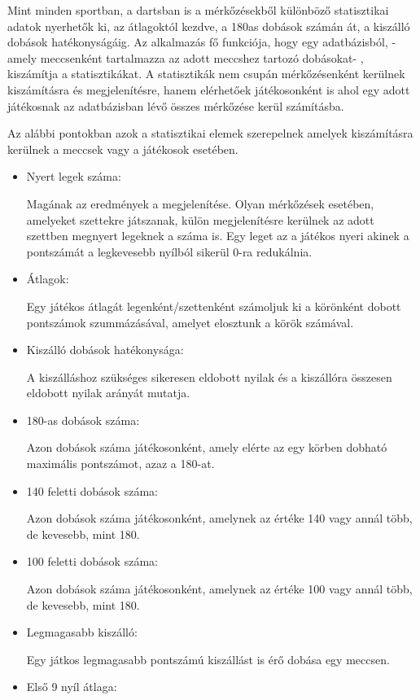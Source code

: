 Mint minden sportban, a dartsban is a mérkőzésekből különböző statisztikai adatok nyerhetők ki, az átlagoktól kezdve, a 180as dobások számán át, a kiszálló dobások hatékonyságáig. Az alkalmazás fő funkciója, hogy egy adatbázisból, - amely meccsenként tartalmazza az adott meccshez tartozó dobásokat- , kiszámítja a statisztikákat. A statisztikák nem csupán mérkőzésenként kerülnek kiszámításra és megjelenítésre, hanem elérhetőek játékosonként is ahol egy adott játékosnak az adatbázisban lévő összes mérkőzése kerül számításba.

Az alábbi pontokban azok a statisztikai elemek szerepelnek amelyek kiszámításra kerülnek a meccsek vagy a játékosok esetében.

\begin{itemize}
\item Nyert legek száma:

Magának az eredmények a megjelenítése. Olyan mérkőzések esetében, amelyeket szettekre játszanak, külön megjelenítésre kerülnek az adott szettben megnyert legeknek a száma is. Egy leget az a játékos nyeri akinek a pontszámát a legkevesebb nyílból sikerül 0-ra redukálnia.
\item Átlagok:

Egy játékos átlagát legenként/szettenként számoljuk ki a körönként dobott pontszámok szummázásával, amelyet elosztunk a körök számával.
\item Kiszálló dobások hatékonysága:

A kiszálláshoz szükséges sikeresen eldobott nyilak és a kiszállóra összesen eldobott nyilak arányát mutatja.
\item 180-as dobások száma:

Azon dobások száma játékosonként, amely elérte az egy körben dobható maximális pontszámot, azaz a 180-at.
\item 140 feletti dobások száma:

Azon dobások száma játékosonként, amelynek az értéke 140 vagy annál több, de kevesebb, mint 180.
\item 100 feletti dobások száma:

Azon dobások száma játékosonként, amelynek az értéke 100 vagy annál több, de kevesebb, mint 180.
\item Legmagasabb kiszálló:

Egy játkos legmagasabb pontszámú kiszállást is érő dobása egy meccsen.
\item Első 9 nyíl átlaga:


\end{itemize}
